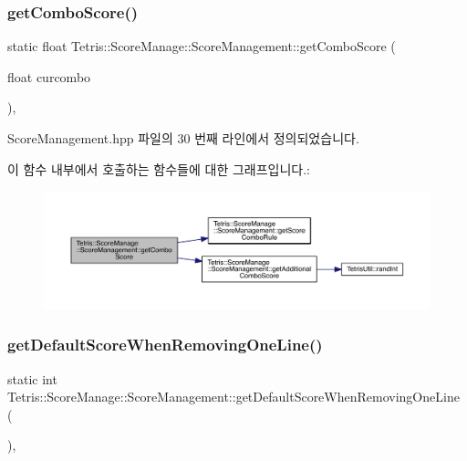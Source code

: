 \subsubsection{\texorpdfstring{get\+Combo\+Score()}{getComboScore()}}
{\footnotesize\ttfamily static float Tetris\+::\+Score\+Manage\+::\+Score\+Management\+::get\+Combo\+Score (\begin{DoxyParamCaption}\item[{float}]{curcombo }\end{DoxyParamCaption})\hspace{0.3cm}{\ttfamily [inline]}, {\ttfamily [static]}}



Score\+Management.\+hpp 파일의 30 번째 라인에서 정의되었습니다.

이 함수 내부에서 호출하는 함수들에 대한 그래프입니다.\+:
\nopagebreak
\begin{figure}[H]
\begin{center}
\leavevmode
\includegraphics[width=350pt]{class_tetris_1_1_score_manage_1_1_score_management_a89203c0689645e7e4ad75d8fd634aa11_cgraph}
\end{center}
\end{figure}
\mbox{\label{class_tetris_1_1_score_manage_1_1_score_management_a1bedf7a989466ad1b6b8b2259eb2eff7}} 
\subsubsection{\texorpdfstring{get\+Default\+Score\+When\+Removing\+One\+Line()}{getDefaultScoreWhenRemovingOneLine()}}
{\footnotesize\ttfamily static int Tetris\+::\+Score\+Manage\+::\+Score\+Management\+::get\+Default\+Score\+When\+Removing\+One\+Line (\begin{DoxyParamCaption}{ }\end{DoxyParamCaption})\hspace{0.3cm}{\ttfamily [inline]}, {\ttfamily [static]}}



